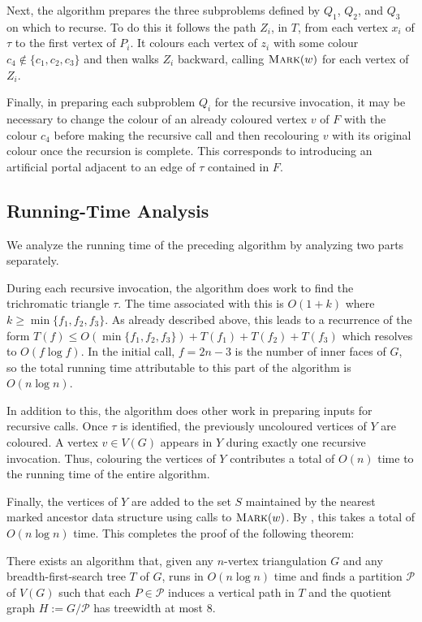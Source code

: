 \documentclass[kpfonts]{patmorin}
\let\le\leqslant
\let\ge\geqslant
\begin{document}
Next, the algorithm prepares the three subproblems defined by $Q_1$, $Q_2$, and $Q_3$ on which to recurse.  To do this it follows the path $Z_i$, in $T$, from each vertex $x_i$ of $\tau$ to the first vertex of $P_i$.  It colours each vertex of $z_i$ with some colour $c_4\not\in\{c_1,c_2,c_3\}$ and then walks $Z_i$ backward, calling $\textsc{Mark}(w)$ for each vertex of $Z_i$.

Finally, in preparing each subproblem $Q_i$ for the recursive invocation, it may be necessary to change the colour of an already coloured vertex $v$ of $F$ with the colour $c_4$ before making the recursive call and then recolouring $v$ with its original colour once the recursion is complete.  This corresponds to introducing an artificial portal adjacent to an edge of $\tau$ contained in $F$.

\subsection{Running-Time Analysis}

We analyze the running time of the preceding algorithm by analyzing two parts separately.

During each recursive invocation, the algorithm does work to find the trichromatic triangle $\tau$.  The time associated with this is $O(1+k)$ where $k\ge \min\{f_1,f_2,f_3\}$.  As already described above, this leads to a recurrence of the form $T(f) \le O(\min\{f_1,f_2,f_3\}) + T(f_1)+T(f_2)+T(f_3)$ which resolves to $O(f\log f)$.  In the initial call, $f=2n-3$ is the number of inner faces of $G$, so the total running time attributable to this part of the algorithm is $O(n\log n)$.

In addition to this, the algorithm does other work in preparing inputs for recursive calls.  Once $\tau$ is identified, the previously uncoloured vertices of $Y$ are coloured.  A vertex $v\in V(G)$ appears in $Y$ during exactly one recursive invocation. Thus, colouring the vertices of $Y$ contributes a total of $O(n)$ time to the running time of the entire algorithm.

Finally, the vertices of $Y$ are added to the set $S$ maintained by the nearest marked ancestor data structure using calls to $\textsc{Mark}(w)$.  By , this takes a total of $O(n\log n)$ time.
This completes the proof of the following theorem:

\begin{thm}
  There exists an algorithm that, given any $n$-vertex triangulation $G$ and any breadth-first-search tree $T$ of $G$, runs in $O(n\log n)$ time and finds a partition $\mathcal{P}$ of $V(G)$ such that each $P\in\mathcal{P}$ induces a vertical path in $T$ and the quotient graph $H:=G/\mathcal{P}$ has treewidth at most $8$.
\end{thm}
\end{document}
